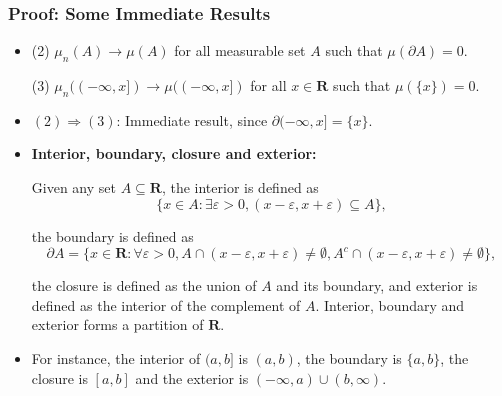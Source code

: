 \documentclass[handout]{beamer}
\begin{document}
\frame
{
  \frametitle{Proof: Some Immediate Results} 

   \begin{itemize}

\item<1->
               
                (2) $\mu_n(A)\rightarrow \mu(A)$ for all measurable set $A$ such that $\mu(\partial A)=0$.  
                              \vspace{2mm}


               {\color{blue}  (3) $\mu_n((-\infty, x])\rightarrow \mu((-\infty, x])$ for all $x\in \mathbf{R}$ such that $\mu(\{x\})=0$.}
                                            \vspace{5mm}

               
               
               
                     \item<2-> $(2)\Rightarrow (3)$: Immediate result, since $\partial (-\infty, x]=\{x\}$.
                     
                      \item<3-> \textbf{Interior, boundary, closure and exterior:} 
                      
                      Given any set $A \subseteq \mathbf{R}$, the interior is defined as 
                      $$\{x\in A: \exists \varepsilon> 0, (x-\varepsilon, x+\varepsilon)\subseteq A\},$$ 
                      
                      the boundary is defined as 
                                            $$\partial A= \{x\in \mathbf{R}: \forall \varepsilon> 0, A\cap (x-\varepsilon, x+\varepsilon)\neq \emptyset, A^c \cap (x-\varepsilon, x+\varepsilon)\neq \emptyset \},$$
                      
                      the closure is defined as the union of $A$ and its boundary, and exterior is defined as the interior of the complement of $A$. Interior, boundary and exterior forms a partition of $\mathbf{R}$.
                     
                     \item<4->      For instance, the interior of $(a, b]$ is $(a, b)$, the boundary is $\{a, b\}$, the closure is $[a, b]$ and the exterior is $(-\infty, a)\cup (b, \infty)$.           
                     
                     
                                               \end{itemize}
}
\end{document}
